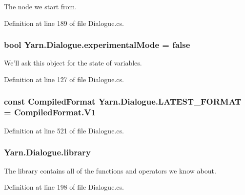 The node we start from. 



Definition at line 189 of file Dialogue.\-cs.

\hypertarget{a00086_a2a5ac23441861eef13c59044cc218f09}{
\subsubsection[{experimental\-Mode}]{\setlength{\rightskip}{0pt plus 5cm}bool Yarn.\-Dialogue.\-experimental\-Mode = false}}\label{a00086_a2a5ac23441861eef13c59044cc218f09}


We'll ask this object for the state of variables. 



Definition at line 127 of file Dialogue.\-cs.

\hypertarget{a00086_a3bc83587462ade6a2f7f42cb7576e50e}{
\subsubsection[{L\-A\-T\-E\-S\-T\-\_\-\-F\-O\-R\-M\-A\-T}]{\setlength{\rightskip}{0pt plus 5cm}const {\bf Compiled\-Format} Yarn.\-Dialogue.\-L\-A\-T\-E\-S\-T\-\_\-\-F\-O\-R\-M\-A\-T = Compiled\-Format.\-V1}}\label{a00086_a3bc83587462ade6a2f7f42cb7576e50e}


Definition at line 521 of file Dialogue.\-cs.

\hypertarget{a00086_ae660d4cfb6e296358d2f61d8ee74c66a}{
\subsubsection[{library}]{ Yarn.\-Dialogue.\-library}}\label{a00086_ae660d4cfb6e296358d2f61d8ee74c66a}


The library contains all of the functions and operators we know about. 



Definition at line 198 of file Dialogue.\-cs.



